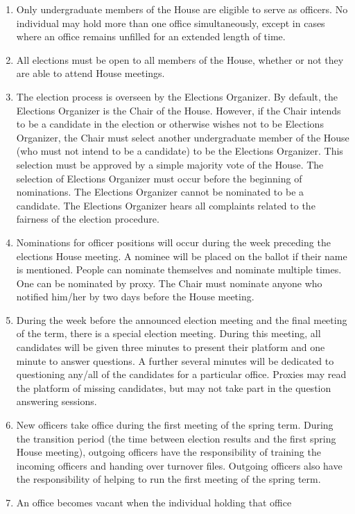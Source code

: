 \documentclass[letterpaper]{article}
\begin{document}
\begin{enumerate}
\begin{enumerate}
\begin{enumerate}
\item Only undergraduate members of the House are eligible to serve as
officers. No individual may hold more than one office simultaneously,
except in cases where an office remains unfilled for an extended length
of time.
\item All elections must be open to all members of the House, whether or
not they are able to attend House meetings.
\item The election process is overseen by the Elections Organizer. By
default, the Elections Organizer is the Chair of the House. However, if
the Chair intends to be a candidate in the election or otherwise wishes
not to be Elections Organizer, the Chair must select another
undergraduate member of the House (who must not intend to be a
candidate) to be the Elections Organizer. This selection must be
approved by a simple majority vote of the House. The selection of
Elections Organizer must occur before the beginning of nominations. The
Elections Organizer cannot be nominated to be a candidate. The
Elections Organizer hears all complaints related to the fairness of the
election procedure.
\item Nominations for officer positions will occur during the week
preceding the elections House meeting. A nominee will be placed on the
ballot if their name is mentioned. People can nominate themselves and
nominate multiple times. One can be nominated by proxy. The Chair must
nominate anyone who notified him/her by two days before the House
meeting.
\item During the week before the announced election meeting and the
final meeting of the term, there is a special election meeting. During
this meeting, all candidates will be given three minutes to present
their platform and one minute to answer questions. A further several
minutes will be dedicated to questioning any/all of the candidates for
a particular office. Proxies may read the platform of missing
candidates, but may not take part in the question answering sessions. 
\item New officers take office during the first meeting of the spring
term. During the transition period (the time between election results
and the first spring House meeting), outgoing officers have the
responsibility of training the incoming officers and handing over
turnover files. Outgoing officers also have the responsibility of
helping to run the first meeting of the spring term.
\item An office becomes vacant when the individual holding that office

\end{enumerate}
\end{enumerate}
\end{enumerate}
\end{document}
